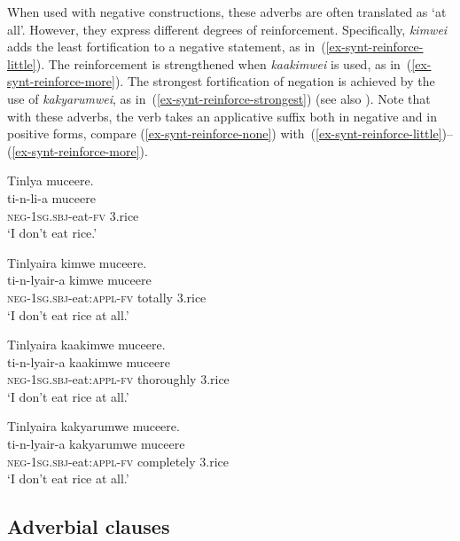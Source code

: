 When used with negative constructions, these adverbs are often translated as `at all'. 
However, they express different degrees of reinforcement. 
Specifically, \textit{kimwei} adds the least fortification to a negative statement, as in~(\ref{ex-synt-reinforce-little}). 
The reinforcement is strengthened when \textit{kaakimwei} is used, as in~(\ref{ex-synt-reinforce-more}). 
The strongest fortification of negation is achieved by the use of \textit{kakyarumwei}, as in~(\ref{ex-synt-reinforce-strongest}) (see also \citealt{Ruppertetal2021Negation}). 
Note that with these adverbs, the verb takes an applicative suffix both in negative and in positive forms, compare (\ref{ex-synt-reinforce-none}) with~(\ref{ex-synt-reinforce-little})–(\ref{ex-synt-reinforce-more}).

\ea \label{ex-synt-reinforce}
\begin{xlist}
\ex \label{ex-synt-reinforce-none}
	\glll  Tinlya muceere.\\
		ti-n-li-a muceere\\
		\textsc{neg}-\textsc{1sg.sbj}-eat-\textsc{fv} 3.rice\\
	\glt ‘I don't eat rice.’ 
	
\ex \label{ex-synt-reinforce-little}
	\glll  Tinlyaira kimwe muceere.\\
		ti-n-lyair-a kimwe muceere\\
		\textsc{neg}-\textsc{1sg.sbj}-eat:\textsc{appl}-\textsc{fv} totally 3.rice\\
	\glt ‘I don't eat rice at all.’ 
	
\ex \label{ex-synt-reinforce-more}
	\glll Tinlyaira kaakimwe muceere.\\
	 ti-n-lyair-a kaakimwe muceere\\
		\textsc{neg}-\textsc{1sg.sbj}-eat:\textsc{appl}-\textsc{fv} thoroughly 3.rice\\
	\glt ‘I don't eat rice at all.’ 
	
\ex \label{ex-synt-reinforce-strongest}
	\glll  Tinlyaira kakyarumwe muceere.\\
	ti-n-lyair-a kakyarumwe muceere\\
		\textsc{neg}-\textsc{1sg.sbj}-eat:\textsc{appl}-\textsc{fv} completely 3.rice\\
	\glt ‘I don't eat rice at all.’  
\end{xlist}
\z


\subsection{Adverbial clauses}\label{sec-syntax-adverbial clauses}

